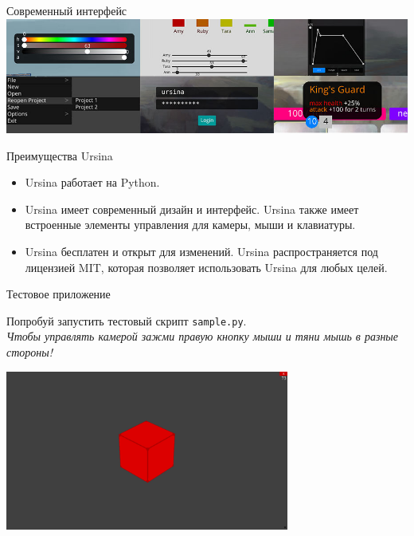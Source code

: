 \documentclass[handout]{beamer}
\begin{document}
    \begin{frame}{Современный интерфейс}
        \includegraphics[width=\textwidth]{img/ursina_ui_banner.jpg}
    \end{frame}


    \begin{frame}{Преимущества Ursina}
        \begin{itemize}
            \item Ursina работает на Python.
            \item Ursina имеет современный дизайн и интерфейс. Ursina также имеет встроенные элементы управления для камеры, мыши и клавиатуры.
            \item Ursina бесплатен и открыт для изменений. Ursina распространяется под лицензией MIT, которая позволяет использовать Ursina для любых целей.
        \end{itemize}
    \end{frame}

    
    \begin{frame}{Тестовое приложение}
        \begin{justify}
            Попробуй запустить тестовый скрипт \texttt{sample.py}. \\ \textit{Чтобы управлять камерой зажми правую кнопку мыши и тяни мышь в разные стороны!}
        \end{justify}
        \begin{center}
            \includegraphics[width=0.7\textwidth]{img/0.png}
        \end{center}
    \end{frame}
\end{document}
